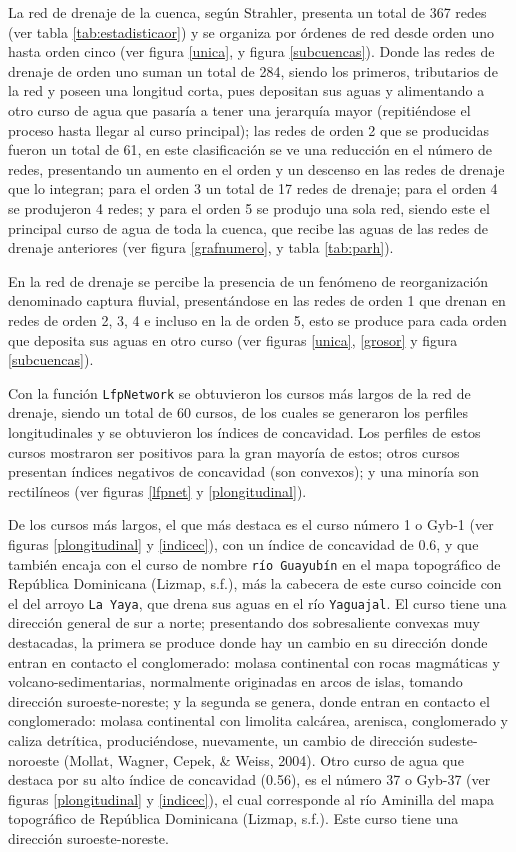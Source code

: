 \documentclass[11pt,]{article}
\begin{document}
La red de drenaje de la cuenca, según Strahler, presenta un total de 367
redes (ver tabla \ref{tab:estadisticaor}) y se organiza por órdenes de
red desde orden uno hasta orden cinco (ver figura \ref{unica}, y figura
\ref{subcuencas}). Donde las redes de drenaje de orden uno suman un
total de 284, siendo los primeros, tributarios de la red y poseen una
longitud corta, pues depositan sus aguas y alimentando a otro curso de
agua que pasaría a tener una jerarquía mayor (repitiéndose el proceso
hasta llegar al curso principal); las redes de orden 2 que se producidas
fueron un total de 61, en este clasificación se ve una reducción en el
número de redes, presentando un aumento en el orden y un descenso en las
redes de drenaje que lo integran; para el orden 3 un total de 17 redes
de drenaje; para el orden 4 se produjeron 4 redes; y para el orden 5 se
produjo una sola red, siendo este el principal curso de agua de toda la
cuenca, que recibe las aguas de las redes de drenaje anteriores (ver
figura \ref{grafnumero}, y tabla \ref{tab:parh}).

En la red de drenaje se percibe la presencia de un fenómeno de
reorganización denominado captura fluvial, presentándose en las redes de
orden 1 que drenan en redes de orden 2, 3, 4 e incluso en la de orden 5,
esto se produce para cada orden que deposita sus aguas en otro curso
(ver figuras \ref{unica}, \ref{grosor} y figura \ref{subcuencas}).

Con la función \texttt{LfpNetwork} se obtuvieron los cursos más largos
de la red de drenaje, siendo un total de 60 cursos, de los cuales se
generaron los perfiles longitudinales y se obtuvieron los índices de
concavidad. Los perfiles de estos cursos mostraron ser positivos para la
gran mayoría de estos; otros cursos presentan índices negativos de
concavidad (son convexos); y una minoría son rectilíneos (ver figuras
\ref{lfpnet} y \ref{plongitudinal}).

De los cursos más largos, el que más destaca es el curso número 1 o
Gyb-1 (ver figuras \ref{plongitudinal} y \ref{indicec}), con un índice
de concavidad de 0.6, y que también encaja con el curso de nombre
\texttt{río\ Guayubín} en el mapa topográfico de República Dominicana
(Lizmap, s.f.), más la cabecera de este curso coincide con el del arroyo
\texttt{La\ Yaya}, que drena sus aguas en el río \texttt{Yaguajal}. El
curso tiene una dirección general de sur a norte; presentando dos
sobresaliente convexas muy destacadas, la primera se produce donde hay
un cambio en su dirección donde entran en contacto el conglomerado:
molasa continental con rocas magmáticas y volcano-sedimentarias,
normalmente originadas en arcos de islas, tomando dirección
suroeste-noreste; y la segunda se genera, donde entran en contacto el
conglomerado: molasa continental con limolita calcárea, arenisca,
conglomerado y caliza detrítica, produciéndose, nuevamente, un cambio de
dirección sudeste-noroeste (Mollat, Wagner, Cepek, \& Weiss, 2004). Otro
curso de agua que destaca por su alto índice de concavidad (0.56), es el
número 37 o Gyb-37 (ver figuras \ref{plongitudinal} y \ref{indicec}), el
cual corresponde al río Aminilla del mapa topográfico de República
Dominicana (Lizmap, s.f.). Este curso tiene una dirección
suroeste-noreste.
\end{document}

